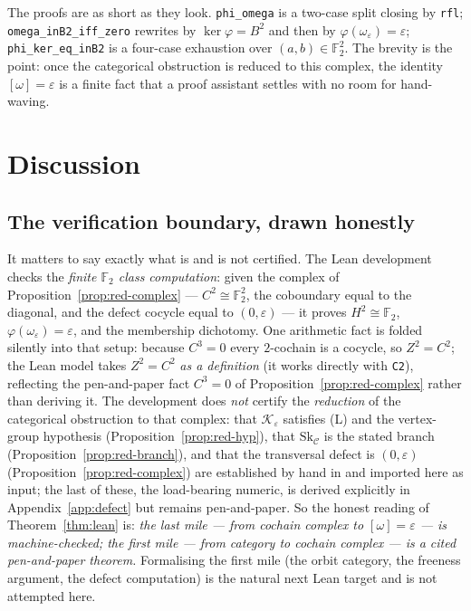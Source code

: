 \documentclass[11pt]{amsart}
\theoremstyle{definition}
\theoremstyle{remark}
\newcommand{\C}{\mathcal{C}}
\newcommand{\K}{\mathcal{K}}
\newcommand{\Sk}{\mathrm{Sk}}
\newcommand{\FF}{\mathbb{F}_2}
\begin{document}
{\sloppy
The proofs are as short as they look. \texttt{phi\_omega} is a two-case split closing by
\texttt{rfl}; \texttt{omega\_inB2\_iff\_zero} rewrites by $\ker\varphi=B^2$ and then by
$\varphi(\omega_\varepsilon)=\varepsilon$; \texttt{phi\_ker\_eq\_inB2} is a four-case exhaustion over
$(a,b)\in\FF^2$. The brevity is the point: once the categorical obstruction is reduced to this
complex, the identity $[\omega]=\varepsilon$ is a finite fact that a proof assistant settles with no
room for hand-waving.\par}

\section{Discussion}\label{sec:disc}

\subsection*{The verification boundary, drawn honestly}
It matters to say exactly what is and is not certified. The Lean development checks the \emph{finite
$\FF$ class computation}: given the complex of Proposition~\ref{prop:red-complex} --- $C^2\cong\FF^2$,
the coboundary equal to the diagonal, and the defect cocycle equal to $(0,\varepsilon)$ --- it proves
$H^2\cong\FF$, $\varphi(\omega_\varepsilon)=\varepsilon$, and the membership dichotomy. One arithmetic
fact is folded silently into that setup: because $C^3=0$ every $2$-cochain is a cocycle, so
$Z^2=C^2$; the Lean model takes $Z^2=C^2$ \emph{as a definition} (it works directly with
\texttt{C2}), reflecting the pen-and-paper fact $C^3=0$ of Proposition~\ref{prop:red-complex} rather
than deriving it. The development does \emph{not} certify the \emph{reduction} of the categorical
obstruction to that complex: that $\K_\varepsilon$ satisfies (L) and the vertex-group hypothesis
(Proposition~\ref{prop:red-hyp}), that $\Sk_\C$ is the stated branch (Proposition~\ref{prop:red-branch}),
and that the transversal defect is $(0,\varepsilon)$ (Proposition~\ref{prop:red-complex}) are
established by hand in \cite{analytic} and imported here as input; the last of these, the load-bearing
numeric, is derived explicitly in Appendix~\ref{app:defect} but remains pen-and-paper. So the honest
reading of Theorem~\ref{thm:lean} is: \emph{the last mile --- from cochain complex to
$[\omega]=\varepsilon$ --- is machine-checked; the first mile --- from category to cochain complex ---
is a cited pen-and-paper theorem.} Formalising the first mile (the orbit category, the freeness
argument, the defect computation) is the natural next Lean target and is not attempted here.
\end{document}
